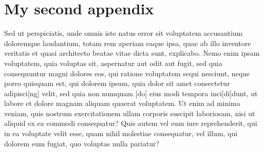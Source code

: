 \documentclass[a4paper,11pt]{article}
\begin{document}
\section{My second appendix }


Sed ut perspiciatis, unde omnis iste natus error sit voluptatem accusantium doloremque laudantium, totam rem aperiam eaque ipsa, quae ab illo inventore veritatis et quasi architecto beatae vitae dicta sunt, explicabo. Nemo enim ipsam voluptatem, quia voluptas sit, aspernatur aut odit aut fugit, sed quia consequuntur magni dolores eos, qui ratione voluptatem sequi nesciunt, neque porro quisquam est, qui dolorem ipsum, quia dolor sit amet consectetur adipisci[ng] velit, sed quia non numquam [do] eius modi tempora inci[di]dunt, ut labore et dolore magnam aliquam quaerat voluptatem. Ut enim ad minima veniam, quis nostrum exercitationem ullam corporis suscipit laboriosam, nisi ut aliquid ex ea commodi consequatur? Quis autem vel eum iure reprehenderit, qui in ea voluptate velit esse, quam nihil molestiae consequatur, vel illum, qui dolorem eum fugiat, quo voluptas nulla pariatur?





\end{document}
